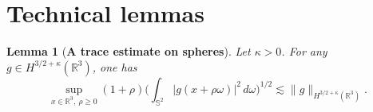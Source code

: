 \documentclass[11pt,twoside]{article}
\theoremstyle{plain}
\newtheorem{lemma}[theorem]{Lemma}
\theoremstyle{definition}
\theoremstyle{assumption}
\numberwithin{equation}{section}
\begin{document}
	
	
	\section{Technical lemmas}\label{sec:b}
	
	\begin{lemma}[{\bf A trace estimate on spheres}]\label{lem:sphere-trace-H32}
		Let $\kappa>0$. For any $g\in H^{3/2+\kappa}(\mathbb R^3)$, one has
		\begin{equation}\label{eq:trace-sphere-H32}
			\sup_{x\in\mathbb R^3,\ \rho\ge0}
			(1+\rho)
			\big(
			\int_{\mathbb S^2}|g(x+\rho\omega)|^2\,d\omega
			\big)^{1/2}
			\lesssim
			\|g\|_{H^{3/2+\kappa}(\mathbb R^3)} .
		\end{equation}
	\end{lemma}
	
\end{document}

